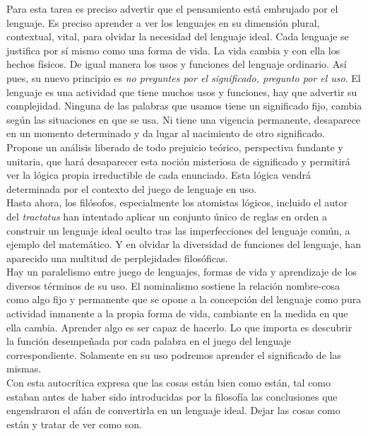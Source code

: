 \documentclass[a4paper, 11pt, twocolumn, spanish]{article}
\begin{document}
Para esta tarea es preciso advertir que el pensamiento está embrujado
por el lenguaje. Es preciso aprender a ver los lenguajes en su
dimensión plural, contextual, vital, para olvidar la necesidad del
lenguaje ideal. Cada lenguaje se justifica por sí mismo como una forma
de vida. La vida cambia y con ella los hechos físicos. De igual manera
los usos y funciones del lenguaje ordinario. Así pues, su nuevo
principio es \emph{no preguntes por el significado, pregunto por el
uso}. El lenguaje es una actividad que tiene muchos usos y funciones,
hay que advertir su complejidad. Ninguna de las palabras que usamos
tiene un significado fijo, cambia según las situaciones en que se
usa. Ni tiene una vigencia permanente, desaparece en un momento
determinado y da lugar al nacimiento de otro significado.\\

Propone un análisis liberado de todo prejuicio teórico, perspectiva
fundante y unitaria, que hará desaparecer esta noción misteriosa de
significado y permitirá ver la lógica propia irreductible de cada
enunciado. Esta lógica vendrá determinada por el contexto del juego de
lenguaje en uso.\\
Hasta ahora, los filósofos, especialmente los atomistas lógicos,
incluido el autor del \emph{tractatus} han intentado aplicar un conjunto
único de reglas en orden a construir un lenguaje ideal oculto tras las
imperfecciones del lenguaje común, a ejemplo del matemático. Y en
olvidar la diversidad de funciones del lenguaje, han aparecido una
multitud de perplejidades filosóficas.\\

Hay un paralelismo entre juego de lenguajes, formas de vida y
aprendizaje de los diversos términos de su uso. El nominalismo
sostiene la relación nombre-cosa como algo fijo y permanente que se
opone a la concepción del lenguaje como pura actividad inmanente a la
propia forma de vida, cambiante en la medida en que ella
cambia. Aprender algo es ser capaz de hacerlo. Lo que importa es
descubrir la función desempeñada por cada palabra en el juego del
lenguaje correspondiente. Solamente en su uso podremos aprender el
significado de las mismas.\\

Con esta autocrítica expresa que las cosas están bien como están, tal
como estaban antes de haber sido introducidas por la filosofía las
conclusiones que engendraron el afán de convertirla en un lenguaje
ideal. Dejar las cosas como están y tratar de ver como son.
\end{document}

